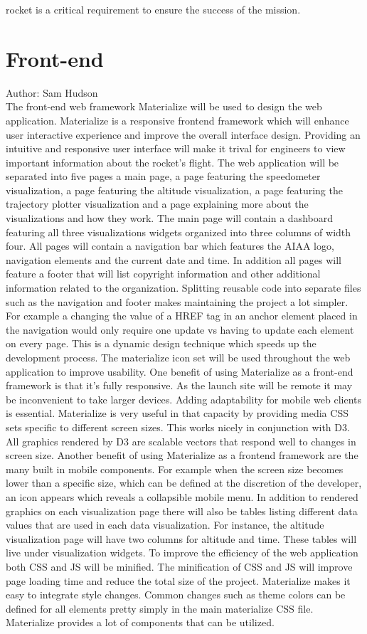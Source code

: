 \documentclass[onecolumn, draftclsnofoot,10pt, compsoc]{IEEEtran}
\begin{document}
rocket is a critical requirement to ensure the success of the mission. 
\section {Front-end}
Author: Sam Hudson\\
The front-end web framework Materialize will be used to design the web application. Materialize is a responsive frontend framework which will enhance user interactive experience and improve the overall interface design. Providing an intuitive and responsive user interface will make it trival for engineers to view important information about the rocket’s flight. The web application will be separated into five pages a main page, a page featuring the speedometer visualization, a page featuring the altitude visualization, a page featuring the trajectory plotter visualization and a page explaining more about the visualizations and how they work. The main page will contain a dashboard featuring all three visualizations widgets organized into three columns of width four. All pages will contain a navigation bar which features the AIAA logo, navigation elements and the current date and time. In addition all pages will feature a footer that will list copyright information and other additional information related to the organization. Splitting reusable code into separate files such as the navigation and footer makes maintaining the project a lot simpler. For example a changing the value of a HREF tag in an anchor element placed in the navigation would only require one update vs having to update each element on every page. This is a dynamic design technique which speeds up the development process. The materialize icon set will be used throughout the web application to improve usability. One benefit of using Materialize as a front-end framework is that it’s fully responsive. As the launch site will be remote it may be inconvenient to take larger devices. Adding adaptability for mobile web clients is essential. Materialize is very useful in that capacity by providing media CSS sets specific to different screen sizes. This works nicely in conjunction with D3. All graphics rendered by D3 are scalable vectors that respond well to changes in screen size. Another benefit of using Materialize as a frontend framework are the many built in mobile components. For example when the screen size becomes lower than a specific size, which can be defined at the discretion of the developer, an icon appears which reveals a collapsible mobile menu. In addition to rendered graphics on each visualization page there will also be tables listing different data values that are used in each data visualization. For instance, the altitude visualization page will have two columns for altitude and time. These tables will live under visualization widgets. To improve the efficiency of the web application both CSS and JS will be minified. The minification of CSS and JS will improve page loading time and reduce the total size of the project. Materialize makes it easy to integrate style changes. Common changes such as theme colors can be defined for all elements pretty simply in the main materialize CSS file. Materialize provides a lot of components that can be utilized. 
\end{document}
